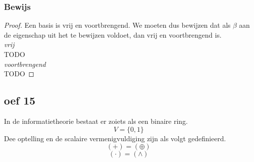 \documentclass[lineaire_algebra_oplossingen.tex]{subfiles}
\begin{document}
\subsubsection*{Bewijs}
\begin{proof}
Een basis is vrij en voortbrengend. We moeten dus bewijzen dat als $\beta$ aan de eigenschap uit het te bewijzen voldoet, dan vrij en voortbrengend is.\\
\emph{vrij}\\
TODO\\
\emph{voortbrengend}\\
TODO
\end{proof}

\subsection{oef 15}
In de informatietheorie bestaat er zoiets als een binaire ring.
\[
V = \{0,1\}
\]
Dee optelling en de scalaire vermenigvuldiging zijn als volgt gedefinieerd.
\[
(+) = (\oplus)
\]
\[
(\cdot) = (\wedge)
\]
\end{document}
